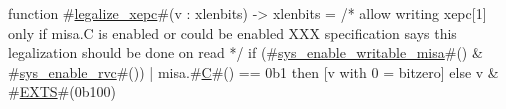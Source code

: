 function #\hyperref[sailRISCVzlegalizzezyxepc]{legalize\_xepc}#(v : xlenbits) -> xlenbits =
  /* allow writing xepc[1] only if misa.C is enabled or could be enabled
     XXX specification says this legalization should be done on read */
  if   (#\hyperref[sailRISCVzsyszyenablezywritablezymisa]{sys\_enable\_writable\_misa}#() & #\hyperref[sailRISCVzsyszyenablezyrvc]{sys\_enable\_rvc}#()) | misa.#\hyperref[sailRISCVzC]{C}#() == 0b1
  then [v with 0 = bitzero]
  else v & #\hyperref[sailRISCVzEXTS]{EXTS}#(0b100)
